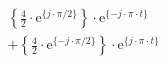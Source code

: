 \correct
\[
\begin{split}
& \left \{ \frac{4}{2} \cdot \textrm{e}^{\{ j \cdot \pi/2 \}} \right \} \cdot \textrm{e}^{\{- j \cdot \pi \cdot t \}}\\
&+\left \{ \frac{4}{2} \cdot \textrm{e}^{\{-j \cdot \pi/2 \}} \right \} \cdot \textrm{e}^{\{  j \cdot \pi \cdot t \}}
\end{split}
\]
